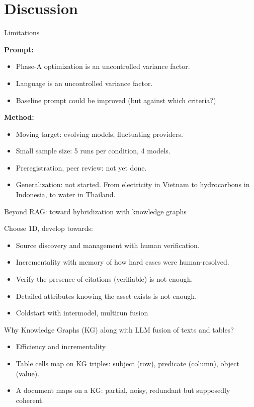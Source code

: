 \documentclass[aspectratio=169]{beamer}
\begin{document}
\section{Discussion}

\begin{frame}[t]{Limitations}

\textbf{Prompt:}
\begin{itemize}
  \item Phase-A optimization is an uncontrolled variance factor.
  \item Language is an uncontrolled variance factor.
  \item Baseline prompt could be improved (but against which criteria?)
\end{itemize}
\medskip
\textbf{Method:}
\begin{itemize}
  \item Moving target: evolving models, fluctuating providers.
  \item Small sample size: 5 runs per condition, 4 models.
  \item Preregistration, peer review: not yet done.
  \item Generalization: not started. From electricity in Vietnam to hydrocarbons in Indonesia, to water in Thailand.
\end{itemize}

\end{frame}

\begin{frame}{Beyond RAG: toward hybridization with knowledge graphs}

Choose 1D, develop towards:

\begin{itemize}
  \item Source discovery and management with human verification.
  \item Incrementality with memory of how hard cases were human-resolved.
  \item Verify the presence of citations (verifiable) is not enough.
  \item Detailed attributes knowing the asset exists is not enough.
  \item Coldstart with intermodel, multirun fusion
\end{itemize}

Why Knowledge Graphs (KG) along with LLM fusion of texts and tables?
\begin{itemize}
\item Efficiency and incrementality
\item Table cells map on KG triples: subject (row), predicate (column), object (value).
\item A document maps on a KG: partial, noisy, redundant but supposedly coherent.
\end{itemize}

\end{frame}
\end{document}
